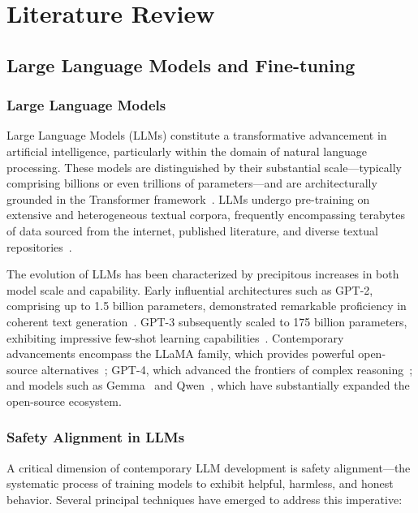 \chapter{Literature Review}
\label{cha:Literature Review}

\section{Large Language Models and Fine-tuning}
\label{sec:llm_finetuning}

\subsection*{Large Language Models}
Large Language Models (LLMs) constitute a transformative advancement in artificial intelligence, particularly within the domain of natural language processing. These models are distinguished by their substantial scale---typically comprising billions or even trillions of parameters---and are architecturally grounded in the Transformer framework~\cite{vaswani2017attention}. LLMs undergo pre-training on extensive and heterogeneous textual corpora, frequently encompassing terabytes of data sourced from the internet, published literature, and diverse textual repositories~\cite{brown2020language, kaplan2020scaling}.

The evolution of LLMs has been characterized by precipitous increases in both model scale and capability. Early influential architectures such as GPT-2, comprising up to 1.5 billion parameters, demonstrated remarkable proficiency in coherent text generation~\cite{radford2019language}. GPT-3 subsequently scaled to 175 billion parameters, exhibiting impressive few-shot learning capabilities~\cite{brown2020language}. Contemporary advancements encompass the LLaMA family, which provides powerful open-source alternatives~\cite{touvron2023llama}; GPT-4, which advanced the frontiers of complex reasoning~\cite{openai2023gpt4}; and models such as Gemma~\cite{team2024gemma} and Qwen~\cite{bai2023qwen}, which have substantially expanded the open-source ecosystem.

\subsection*{Safety Alignment in LLMs}
A critical dimension of contemporary LLM development is safety alignment---the systematic process of training models to exhibit helpful, harmless, and honest behavior. Several principal techniques have emerged to address this imperative:

